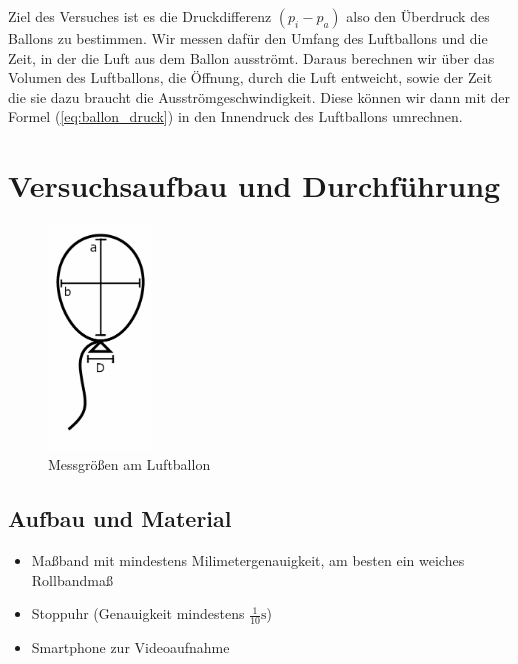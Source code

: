 \documentclass{article}
\begin{document}
    Ziel des Versuches ist es die Druckdifferenz \( (p_i - p_a) \) also den Überdruck des Ballons \cite{Überdruck} zu bestimmen.
    Wir messen dafür den Umfang des Luftballons und die Zeit, in der die Luft aus dem Ballon ausströmt.
    Daraus berechnen wir über das Volumen des Luftballons, die Öffnung, durch die Luft entweicht,
    sowie der Zeit die sie dazu braucht die Ausströmgeschwindigkeit.
    Diese können wir dann mit der Formel (\ref{eq:ballon_druck}) in den Innendruck des Luftballons umrechnen.

    \section{Versuchsaufbau und Durchführung}
    
    \begin{figure}[h]\label{fig:abmessungen}
        \centering
        \includegraphics[height=6cm]{luftballons.png}
        \caption{Messgrößen am Luftballon}
    \end{figure}

    \subsection{Aufbau und Material}
    \begin{itemize}
        \item Maßband mit mindestens Milimetergenauigkeit, am besten ein weiches Rollbandmaß
        \item Stoppuhr (Genauigkeit mindestens \( \frac{1}{10}\unit{\second} \))
        \item Smartphone zur Videoaufnahme
    \end{itemize}
\end{document}
